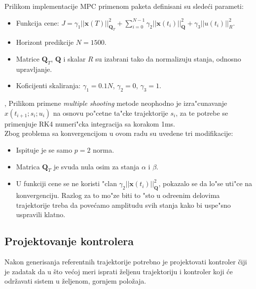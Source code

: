 \documentclass[a4paper,11pt]{article}
\theoremstyle{definition} \newtheorem{deff}{Definicija}[section]
\theoremstyle{definition} \newtheorem{prim}[deff]{Primer}
\theoremstyle{plain} \newtheorem{teor}[deff]{Teorema}
\begin{document}
	Prilikom implementacije MPC primenom \cite{CASADI} paketa definisani su slede\'ci parameti:
	\begin{itemize}
		\item Funkcija cene: $J = \gamma_1||\mathbf{x}(T)||^2_{\mathbf{Q}_T} + \sum_{i = 0}^{N-1}\gamma_2||\mathbf{x}(t_i)||^2_{\mathbf{Q}} + \gamma_3||u(t_i)||^2_{R}$.
		\item Horizont predikcije $N = 1500$.
		\item Matrice $\mathbf{Q}_T$, $\mathbf{Q}$ i skalar $R$ su izabrani tako da normalizuju stanja, odnosno upravljanje. 
		\item Koficijenti skaliranja: $\gamma_1 = 0.1N$, $\gamma_2=0$, $\gamma_3=1$. 
		
	\end{itemize}, 
	 Prilikom primene \emph{multiple shooting} metode neophodno je izra"cunavanje $x(t_{i+1}; s_i; u_i)$ na osnovu po"cetne ta"cke trajektorije $s_i$, za te potrebe se primenjuje RK4 numeri"cka integracija sa korakom 1ms. \\
	
	Zbog problema sa konvergencijom u ovom radu su uvedene tri modifikacije:
	\begin{itemize}
		\item Ispituje je se samo $p=2$ norma.
		\item Matrica $\mathbf{Q}_T$ je svuda nula osim za stanja $\alpha$ i $\beta$.
		\item U funkciji cene se ne koristi "clan $\gamma_2||\mathbf{x}(t_i)||^2_{\mathbf{Q}}$, pokazalo se da lo"se uti"ce na konvergenciju. Razlog za to mo"ze biti to "sto u odre\dj enim delovima trajektorije treba da pove\'camo amplitudu svih stanja kako bi uspe"sno uspravili klatno.
	\end{itemize}
	
	
	
	
	
	
	
	
	
	
	
	 
	
	
	\newpage
	\subsection{Projektovanje kontrolera}\label{sec:LQR}
	
	Nakon generisanja referentnih trajektorije potrebno je projektovati kontroler čiji je zadatak da u što većoj meri isprati željenu trajektoriju i kontroler koji će održavati sistem u željenom, gornjem položaja. \\
	
\end{document}
